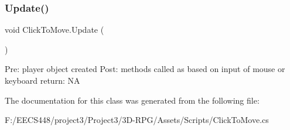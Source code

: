 \subsubsection{\texorpdfstring{Update()}{Update()}}
{\footnotesize\ttfamily void Click\+To\+Move.\+Update (\begin{DoxyParamCaption}{ }\end{DoxyParamCaption})\hspace{0.3cm}{\ttfamily [private]}}

Pre\+: player object created Post\+: methods called as based on input of mouse or keyboard return\+: NA 

The documentation for this class was generated from the following file\+:\begin{DoxyCompactItemize}
\item 
F\+:/\+E\+E\+C\+S448/project3/\+Project3/3\+D-\/\+R\+P\+G/\+Assets/\+Scripts/Click\+To\+Move.\+cs\end{DoxyCompactItemize}
